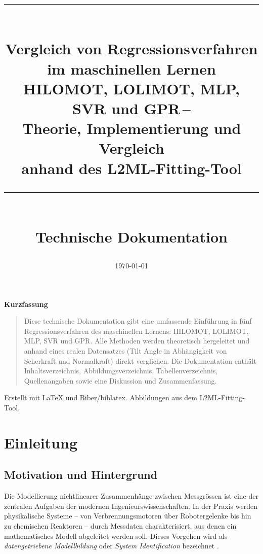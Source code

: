 \documentclass[11pt,a4paper]{report}
\title{%
\vspace{-1.5cm}%
\rule{\linewidth}{0.5mm}\\[8pt]
{\LARGE\bfseries Vergleich von Regressionsverfahren\\[6pt]
im maschinellen Lernen}\\[8pt]
{\large HILOMOT, LOLIMOT, MLP, SVR und GPR\,--\\[4pt]
Theorie, Implementierung und Vergleich\\
anhand des L2ML-Fitting-Tool}\\[8pt]
\rule{\linewidth}{0.5mm}\\[20pt]
{\large Technische Dokumentation}
}
\author{}
\date{\today}
\begin{document}
\maketitle
\thispagestyle{empty}
\vspace{3cm}

\begin{center}
{\large\bfseries Kurzfassung}
\end{center}
\begin{quote}
Diese technische Dokumentation gibt eine umfassende Einf\"{u}hrung in f\"{u}nf Regressionsverfahren
des maschinellen Lernens: HILOMOT, LOLIMOT, MLP, SVR und GPR.
Alle Methoden werden theoretisch hergeleitet und anhand eines realen Datensatzes
(Tilt Angle in Abh\"{a}ngigkeit von Scherkraft und Normalkraft) direkt verglichen.
Die Dokumentation enth\"{a}lt Inhaltsverzeichnis, Abbildungsverzeichnis, Tabellenverzeichnis,
Quellenangaben sowie eine Diskussion und Zusammenfassung.
\end{quote}

\vfill
\begin{center}
{\small Erstellt mit \LaTeX{} und Biber/biblatex. Abbildungen aus dem L2ML-Fitting-Tool.}
\end{center}

\clearpage

\tableofcontents
\clearpage
\listoffigures
{}
\clearpage
\listoftables
{}
\clearpage
{}

\chapter{Einleitung}

\section{Motivation und Hintergrund}

Die Modellierung nichtlinearer Zusammenh\"{a}nge zwischen Messgr\"{o}ssen ist eine der zentralen
Aufgaben der modernen Ingenieurswissenschaften. In der Praxis werden physikalische Systeme --
von Verbrennungsmotoren \"{u}ber Robotergelenke bis hin zu chemischen Reaktoren -- durch
Messdaten charakterisiert, aus denen ein mathematisches Modell abgeleitet werden soll. Dieses
Vorgehen wird als \emph{datengetriebene Modellbildung} oder \emph{System Identification}
bezeichnet \cite{nelles2001}.
\end{document}
